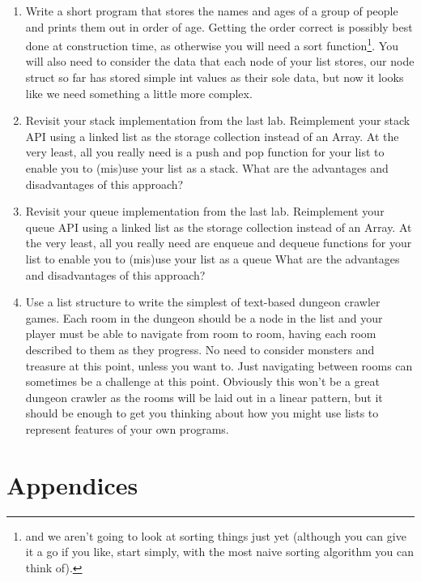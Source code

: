 \documentclass[10pt, a4paper, twosize]{article}
\begin{document}
\begin{enumerate}
\item Write a short program that stores the names and ages of a group of people and prints them out in order of age. Getting the order correct is possibly best done at construction time, as otherwise you will need a sort function\footnote{and we aren't going to look at sorting things just yet (although you can give it a go if you like, start simply, with the most naive sorting algorithm you can think of).}. You will also need to consider the data that each node of your list stores, our node struct so far has stored simple int values as their sole data, but now it looks like we need something a little more complex.
\item Revisit your stack implementation from the last lab. Reimplement your stack API using a linked list as the storage collection instead of an Array. At the very least, all you really need is a push and pop function for your list to enable you to (mis)use your list as a stack. What are the advantages and disadvantages of this approach?
\item Revisit your queue implementation from the last lab. Reimplement your queue API using a linked list as the storage collection instead of an Array. At the very least, all you really need are enqueue and dequeue functions for your list to enable you to (mis)use your list as a queue What are the advantages and disadvantages of this approach?
\item Use a list structure to write the simplest of text-based dungeon crawler games. Each room in the dungeon should be a node in the list and your player must be able to navigate from room to room, having each room described to them as they progress. No need to consider monsters and treasure at this point, unless you want to. Just navigating between rooms can sometimes be a challenge at this point. Obviously this won't be a great dungeon crawler as the rooms will be laid out in a linear pattern, but it should be enough to get you thinking about how you might use lists to represent features of your own programs.
\end{enumerate}

\paragraph{} 


\part{Appendices}
\end{document}
